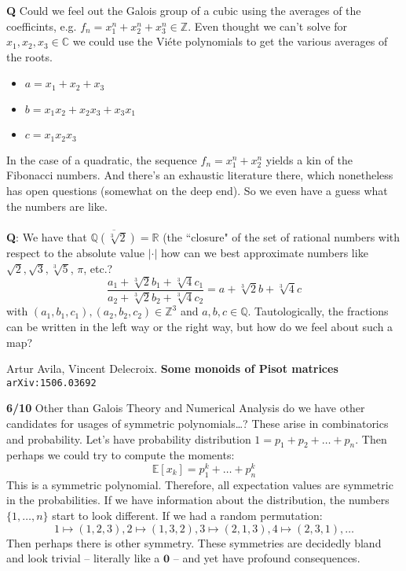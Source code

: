 \documentclass[12pt]{article}
\begin{document}
\textbf{Q} Could we feel out the Galois group of a cubic using the averages of the coefficints, e.g. $f_n= x_1^n + x_2^n + x_3^n \in \mathbb{Z}$.  Even thought we can't solve for $x_1, x_2, x_3 \in \mathbb{C}$ we could use the Vi\'{e}te polynomials to get the various averages of the roots.
\begin{itemize}
\item $a = x_1 + x_2 + x_3$
\item $b = x_1x_2 + x_2x_3+x_3x_1$
\item $c = x_1x_2x_3$
\end{itemize}
In the case of a quadratic, the sequence $f_n = x_1^n + x_2^n$ yields a kin of the Fibonacci numbers.  And there's an exhaustic literature there, which nonetheless has open questions (somewhat on the deep end).  So we even have a guess what the numbers are like. \\ \\
\textbf{Q}: We have that $\overline{\mathbb{Q}(\sqrt[3]{2})} = \mathbb{R}$ (the ``closure" of the set of rational numbers with respect to the absolute value $|\cdot|$ how can we best approximate numbers like $\sqrt{2}, \sqrt{3}, \sqrt[3]{5}$, $\pi$, etc.?
$$ \frac{a_1 + \sqrt[3]{2}b_1+ \sqrt[3]{4}c_1}{a_2 + \sqrt[3]{2}b_2 +\sqrt[3]{4}c_2} = a + \sqrt[3]{2}b +\sqrt[3]{4}c $$  
with $(a_1, b_1, c_1), (a_2, b_2, c_2) \in \mathbb{Z}^3$ and $a,b,c \in \mathbb{Q}$. Tautologically, the fractions can be written in the left way or the right way, but how do we feel about such a map?

\newpage

\begin{thebibliography}{}
\item Artur Avila, Vincent Delecroix. \textbf{Some monoids of Pisot matrices} \texttt{arXiv:1506.03692}
\end{thebibliography} 

\noindent \textbf{6/10} Other than Galois Theory and Numerical Analysis do we have other candidates for usages of symmetric polynomials\dots ? These arise in combinatorics and probability.  Let's have probability distribution $1 = p_1 + p_2 + \dots + p_n$.  Then perhaps we could try to compute the moments:
$$ \mathbb{E}[x_k] = p_1^k + \dots + p_n^k $$
This is a symmetric polynomial.  Therefore, all expectation values are symmetric in the probabilities.  If we have information about the distribution, the numbers $\{ 1, \dots, n\}$ start to look different.  If we had a random permutation:
$$ 1 \mapsto (1,2,3), 2 \mapsto (1,3,2), 3 \mapsto (2,1,3), 4 \mapsto (2,3,1), \dots $$
Then perhaps there is other symmetry.  These symmetries are decidedly bland and look trivial -- literally like a $\mathbf{0}$ -- and yet have profound consequences.
\end{document}
